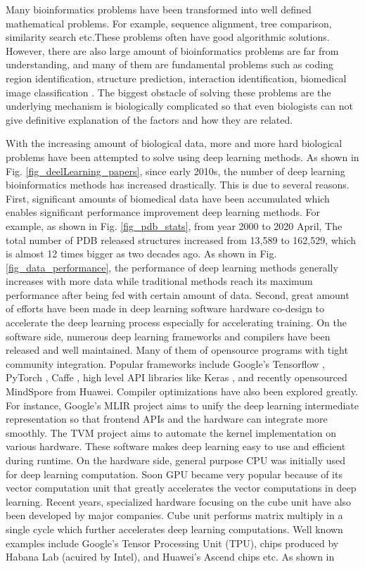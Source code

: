 Many bioinformatics problems have been transformed into well defined mathematical problems. For example, sequence alignment, tree comparison, similarity search etc.These problems often have good algorithmic solutions. However, there are also large amount of bioinformatics problems are far from understanding, and many of them are fundamental problems such as coding region identification, structure prediction, interaction identification, biomedical image classification \cite{larranaga2006machine}. The biggest obstacle of solving these problems are the underlying mechanism is biologically complicated so that even biologists can not give definitive explanation of the factors and how they are related. 

With the increasing amount of biological data, more and more hard biological problems have been attempted to solve using deep learning methods. As shown in Fig. \ref{fig_deelLearning_papers}, since early 2010s, the number of deep learning bioinformatics methods has increased drastically. This is due to several reasons. First, significant amounts of biomedical data have been accumulated which enables significant performance improvement deep learning methods. For example, as shown in Fig. \ref{fig_pdb_stats}, from year 2000 to 2020 April, The total number of PDB \cite{berman2002protein} released structures increased from 13,589 to 162,529, which is almost 12 times bigger as two decades ago. As shown in Fig. \ref{fig_data_performance}, the performance of deep learning methods generally increases with more data while traditional methods reach its maximum performance after being fed with certain amount of data. Second, great amount of efforts have been made in deep learning software hardware co-design to accelerate the deep learning process especially for accelerating training. On the software side, numerous deep learning frameworks and compilers have been released and well maintained. Many of them of opensource programs with tight community integration. Popular frameworks include Google's Tensorflow \cite{tensorflow2015-whitepaper}, PyTorch \cite{NEURIPS2019_9015}, Caffe \cite{jia2014caffe}, high level API libraries like Keras \cite{chollet2015keras}, and recently opensourced MindSpore \cite{liao2019davinci} from Huawei. Compiler optimizations have also been explored greatly. For instance, Google's MLIR \cite{lattner2020mlir} project aims to unify the deep learning intermediate representation so that frontend APIs and the hardware can integrate more smoothly. The TVM \cite{chen2018tvm} project aims to automate the kernel implementation on various hardware.  These software makes deep learning easy to use and efficient during runtime. On the hardware side, general purpose CPU was initially used for deep learning computation. Soon GPU became very popular because of its vector computation unit that greatly accelerates the vector computations in deep learning. Recent years, specialized hardware focusing on the cube unit have also been developed by major companies. Cube unit performs matrix multiply in a single cycle which further accelerates deep learning computations. Well known examples include Google's Tensor Processing Unit (TPU), chips produced by Habana Lab (acuired by Intel), and Huawei's Ascend chips etc. As shown in 